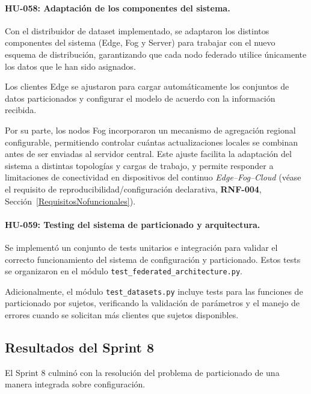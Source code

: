 \documentclass{report}
\begin{document}
\paragraph{HU-058: Adaptación de los componentes del sistema.}
Con el distribuidor de dataset implementado, se adaptaron los distintos componentes del sistema (Edge, Fog y Server) para trabajar con el nuevo esquema de distribución, garantizando que cada nodo federado utilice únicamente los datos que le han sido asignados.

Los clientes Edge se ajustaron para cargar automáticamente los conjuntos de datos particionados y configurar el modelo de acuerdo con la información recibida. 

Por su parte, los nodos Fog incorporaron un mecanismo de agregación regional configurable, permitiendo controlar cuántas actualizaciones locales se combinan antes de ser enviadas al servidor central. Este ajuste facilita la adaptación del sistema a distintas topologías y cargas de trabajo, y permite responder a limitaciones de conectividad en dispositivos del continuo \textit{Edge--Fog--Cloud} (véase el requisito de reproducibilidad/configuración declarativa, \textbf{RNF-004}, Sección~\ref{RequisitosNofuncionales}).



\vspace{0.15em}
\paragraph{HU-059: Testing del sistema de particionado y arquitectura.}

Se implementó un conjunto de tests unitarios e integración para validar el correcto funcionamiento del sistema de configuración y particionado. Estos tests se organizaron en el módulo \texttt{test\_federated\_architecture.py}.

Adicionalmente, el módulo \texttt{test\_datasets.py} incluye tests para las funciones de particionado por sujetos, verificando la validación de parámetros y el manejo de errores cuando se solicitan más clientes que sujetos disponibles.

\subsection{Resultados del Sprint 8}

El Sprint 8 culminó con la resolución del problema de particionado de una manera integrada sobre configuración.

\vspace{0.15em}
\end{document}
